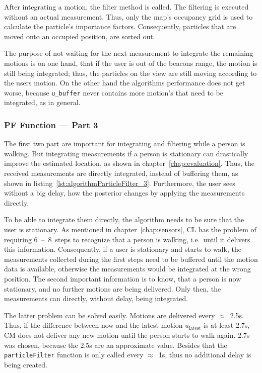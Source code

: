 After integrating a motion, the filter method is called. The filtering is executed without an actual measurement. Thus, only the map's occupancy grid is used to calculate the particle's importance factors. Consequently, particles that are moved onto an occupied position, are sorted out.

The purpose of not waiting for the next measurement to integrate the remaining motions is on one hand, that if the user is out of the beacons range, the motion is still being integrated; thus, the particles on the view are still moving according to the users motion. On the other hand the algorithms performance does not get worse, because \texttt{u\_buffer} never contains more motion's that need to be integrated, as in general.




\subsubsection*{\acl{PF} Function --- Part 3}
The first two part are important for integrating and filtering while a person is walking. But integrating measurements if a person is stationary can drastically improve the estimated location, as shown in chapter~\ref{chap:evaluation}. Thus, the received measurements are directly integrated, instead of buffering them, as shown in listing~\ref{lst:algorithmParticleFilter_3}. Furthermore, the user sees without a big delay, how the posterior changes by applying the measurements directly.

To be able to integrate them directly, the algorithm needs to be sure that the user is stationary. As mentioned in chapter~\ref{chap:sensors}, \acs{CL} has the problem of requiring 6~--~8~steps to recognize that a person is walking, i.e.\ until it delivers this information. Consequently, if a user is stationary and starts to walk, the measurements collected during the first steps need to be buffered until the motion data is available, otherwise the measurements would be integrated at the wrong position. The second important information is to know, that a person is now stationary, and no further motions are being delivered. Only then, the measurements can directly, without delay, being integrated.

The latter problem can be solved easily. Motions are delivered every $\approx$~2.5s. Thus, if the difference between now and the latest motion $u_\text{latest}$ is at least 2.7s, \acs{CM} does not deliver any new motion until the person starts to walk again. 2.7s was chosen, because the 2.5s are an approximate value. Besides that the \texttt{particleFilter} function is only called every $\approx$~1s, thus no additional delay is being created.

